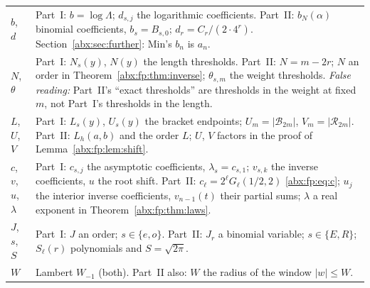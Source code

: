 \documentclass[11pt,letterpaper]{article}
\numberwithin{equation}{section}
\theoremstyle{remark}\newtheorem{remark}[theorem]{Remark}
\newcommand{\BB}{\mathcal B}
\newcommand{\RR}{\mathcal R}
\newcommand{\sq}{\sqrt{2\pi}}
\begin{document}
\begin{longtable}{@{}>{\raggedright\arraybackslash}p{} >{\raggedright\arraybackslash}p{}@{}}
$b$, $d$ & Part~I: $b=\log\Lambda$; $d_{s,j}$ the logarithmic coefficients. Part~II: $b_N(\alpha)$ binomial coefficients, $b_s=B_{s,0}$; $d_r=C_r/(2\cdot4^r)$. Section~\ref{abx:sec:further}: Min's $b_n$ is $a_n$.\\
$N$, $\theta$ & Part~I: $N_s(y)$, $N(y)$ the length thresholds. Part~II: $N=m-2r$; $N$ an order in Theorem~\ref{abx:fp:thm:inverse}; $\theta_{s,m}$ the weight thresholds. \emph{False reading:} Part~II's ``exact thresholds'' are thresholds in the weight at fixed $m$, not Part~I's thresholds in the length.\\
$L$, $U$, $V$ & Part~I: $L_s(y)$, $U_s(y)$ the bracket endpoints; $U_m=|\BB_{2m}|$, $V_m=|\RR_{2m}|$. Part~II: $L_h(a,b)$ and the order $L$; $U$, $V$ factors in the proof of Lemma~\ref{abx:fp:lem:shift}.\\
$c$, $v$, $u$, $\lambda$ & Part~I: $c_{s,j}$ the asymptotic coefficients, $\lambda_s=c_{s,1}$; $v_{s,k}$ the inverse coefficients, $u$ the root shift. Part~II: $c_\ell=2^\ell G_\ell(1/2,2)$ \eqref{abx:fp:eq:c}; $u_j$ the interior inverse coefficients, $v_{n-1}(t)$ their partial sums; $\lambda$ a real exponent in Theorem~\ref{abx:fp:thm:laws}.\\
$J$, $s$, $S$ & Part~I: $J$ an order; $s\in\{e,o\}$. Part~II: $J_r$ a binomial variable; $s\in\{E,R\}$; $S_\ell(r)$ polynomials and $S=\sq$.\\
$W$ & Lambert $W_{-1}$ (both). Part~II also: $W$ the radius of the window $|w|\le W$.\\
\bottomrule
\end{longtable}
\addtocounter{table}{-1}%
\endgroup
\end{document}
